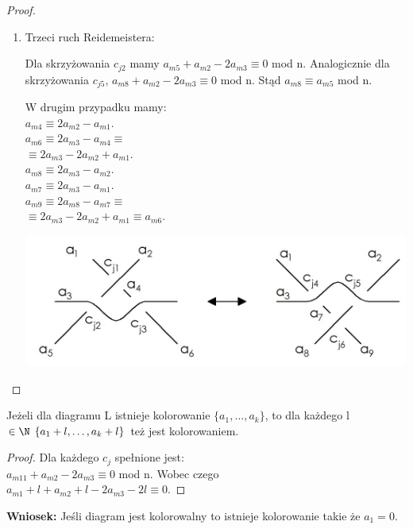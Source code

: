 \begin{proof}
\begin{enumerate}
\item Trzeci ruch Reidemeistera: 


	Dla skrzyżowania $c_{j2}$ mamy $a_{m5}+a_{m2}-2a_{m3} \equiv 0$ mod n. Analogicznie dla skrzyżowania $c_{j5}$, $a_{m8}+a_{m2}-2a_{m3} \equiv 0$ mod n. Stąd $a_{m8} \equiv a_{m5}$ mod n. \\
	\begin{minipage}{0.35\textwidth}
	W drugim przypadku mamy:\\
	$a_{m4} \equiv 2a_{m2}-a_{m1}$. \\
	$a_{m6} \equiv 2a_{m3}-a_{m4} \equiv$ \\$\equiv 2a_{m3}-2a_{m2}+a_{m1} $.	\\
	$a_{m8} \equiv 2a_{m3}-a_{m2}$. \\	
	$a_{m7} \equiv 2a_{m3}-a_{m1}$.\\		
	$a_{m9} \equiv 2a_{m8}-a_{m7} \equiv$ \\$\equiv 2a_{m3}-2a_{m2}+a_{m1} \equiv a_{m6} $. \\
	\end{minipage}
	\begin{minipage}{0.65\textwidth}
		\begin{center}
			\includegraphics[scale=0.2]{2/Obrazy/R3}
		\end{center}
	\end{minipage}
	
\end{enumerate}
\end{proof}

\begin{lemat}
Jeżeli dla diagramu L istnieje kolorowanie $\lbrace a_{1}, \ldots , a_{k} \rbrace$, to dla każdego l $\in \N\:\: \lbrace a_{1}+l, \ldots , a_{k}+l \rbrace$ też jest kolorowaniem.
\end{lemat}
\begin{proof}
Dla każdego $c_{j}$ spełnione jest:\\
$a_{m11}+a_{m2}-2a_{m3} \equiv 0$ mod n. Wobec czego \\ 
$a_{m1}+l+a_{m2}+l-2a_{m3}-2l \equiv 0$.
\end{proof}
\textbf{Wniosek:} Jeśli diagram jest kolorowalny to istnieje kolorowanie takie że $a_{1} = 0$.

